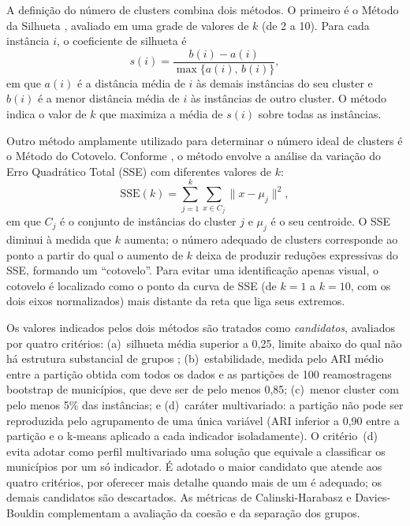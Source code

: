 \documentclass[12pt]{article}
\begin{document}
A definição do número de clusters combina dois métodos. O primeiro é o Método da Silhueta
\cite{rousseeuw1987}, avaliado em uma grade de valores de $k$ (de 2 a 10). Para cada instância $i$,
o coeficiente de silhueta é
\begin{equation}
  s(i) = \frac{b(i) - a(i)}{\max\{a(i),\, b(i)\}},
\end{equation}
em que $a(i)$ é a distância média de $i$ às demais instâncias do seu cluster e $b(i)$ é a menor
distância média de $i$ às instâncias de outro cluster. O método indica o valor de $k$ que maximiza a
média de $s(i)$ sobre todas as instâncias.

Outro método amplamente utilizado para determinar o número ideal de clusters é o Método do
Cotovelo. Conforme \cite{nainggolan2019}, o método envolve a análise da variação do Erro Quadrático
Total (SSE) com diferentes valores de $k$:
\begin{equation}
  \mathrm{SSE}(k) = \sum_{j=1}^{k} \sum_{x \in C_j} \lVert x - \mu_j \rVert^2,
\end{equation}
em que $C_j$ é o conjunto de instâncias do cluster $j$ e $\mu_j$ é o seu centroide. O SSE diminui à
medida que $k$ aumenta; o número adequado de clusters corresponde ao ponto a partir do qual o
aumento de $k$ deixa de produzir reduções expressivas do SSE, formando um ``cotovelo''. Para evitar
uma identificação apenas visual, o cotovelo é localizado como o ponto da curva de SSE (de $k = 1$ a
$k = 10$, com os dois eixos normalizados) mais distante da reta que liga seus extremos.

Os valores indicados pelos dois métodos são tratados como \emph{candidatos}, avaliados por quatro
critérios: (a)~silhueta média superior a 0,25, limite abaixo do qual não há estrutura substancial
de grupos \cite{kaufman1990}; (b)~estabilidade, medida pelo ARI médio entre a partição obtida com
todos os dados e as partições de 100 reamostragens bootstrap de municípios, que deve ser de pelo
menos 0,85; (c)~menor cluster com pelo menos 5\% das instâncias; e (d)~caráter multivariado: a
partição não pode ser reproduzida pelo agrupamento de uma única variável (ARI inferior a 0,90 entre
a partição e o k-means aplicado a cada indicador isoladamente). O critério~(d) evita adotar como
perfil multivariado uma solução que equivale a classificar os municípios por um só indicador. É
adotado o maior candidato que atende aos quatro critérios, por oferecer mais detalhe quando mais de
um é adequado; os demais candidatos são descartados. As métricas de Calinski-Harabasz
\cite{calinski1974} e Davies-Bouldin \cite{davies1979} complementam a avaliação da coesão e da
separação dos grupos.
\end{document}
